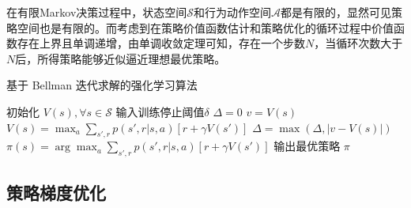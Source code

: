 在有限Markov决策过程中，状态空间$\mathcal{S}$和行为动作空间$\mathcal{A}$都是有限的，显然可见策略空间也是有限的。而考虑到在策略价值函数估计和策略优化的循环过程中价值函数存在上界且单调递增，由单调收敛定理可知，存在一个步数$N$，当循环次数大于$N$后，所得策略能够近似逼近理想最优策略。

\begin{algorithm}[ht]
    \caption{基于 Bellman 迭代求解的强化学习算法}
    \label{algo:bellman-update}
    \begin{algorithmic}
        \STATE 初始化 $V(s), \forall s\in \mathcal S$
        \STATE 输入训练停止阈值$\delta$
        \STATE
        \REPEAT
        \STATE $\Delta= 0$
        \STATE $v= V(s)$
        \STATE $V(s)= \max_a\sum_{s',r}p(s',r|s,a)[r+\gamma V(s')]$
        \STATE $\Delta = \max(\Delta,|v-V(s)|)$
        \ENDFOR
        \UNTIL{ $\Delta<\delta$}
        \STATE $\pi(s)=\arg\max_a\sum_{s',r}p(s',r|s,a)[r+\gamma V(s')]$
        \STATE
        \STATE 输出最优策略 $\pi$
    \end{algorithmic}
\end{algorithm}

\subsection{策略梯度优化}

